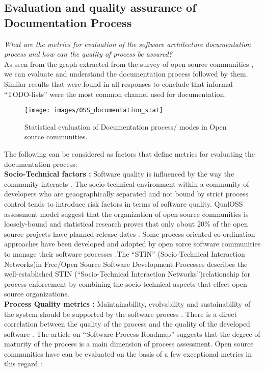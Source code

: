 \subsection{Evaluation and quality assurance of Documentation Process}
\indent \emph{What are the metrics for evaluation of the software architecture documentation process and how can the quality of process be assured?}
\\\indent As seen from the graph extracted from the survey of open source communities \cite{Zhao2003}, we can evaluate and understand the documentation process followed by them. Similar results that were found in all responses to conclude that informal \enquote{TODO-lists} were the most common channel used for documentation.
\begin{figure}[H]
  \centering
  \texttt{[image: images/OSS\_documentation\_stat]}
  \caption[Statistical evaluation of Documentation process/ modes in Open source communities]{Statistical evaluation of Documentation process/ modes in Open source communities.}\label{fig:MWDocProc}
\end{figure}
\indent The following can be considered as factors that define metrics for evaluating the documentation process:
\\\indent \textbf{Socio-Technical factors : } Software quality is influenced by the way the community interacts \cite{Mens2011}. The socio-technical environment within a community of developers who are geaographically separated and not bound by strict process control tends to introduce risk factors in terms of software quality. QualOSS assessment model \cite{5314237} suggest that the organization of open source communities is loosely-bound and statistical research \cite{Zhao2003} proves that only about 20\% of the open source projects have planned release dates . Some process oriented co-ordination approaches have been developed and adopted by open sorce software communities to manage their software processes .The \enquote{STIN} (Socio-Technical Interaction Networks)in Free/Open Source Software Development Processes \cite{SPM_2005} describes the well-established STIN (\enquote{Socio-Technical Interaction Networks})relationship for process enforcement by combining the socio-technical aspects that effect open source organizations. 
\\\indent \textbf{Process Quality metrics : } Maintainability, evolvability and sustainability of the system should be supported by the software process \cite{BachmannDocumentingSoftware2010} \cite{5314237}. There is a direct correlation between the quality of the process and the quality of the developed software \cite{Fuggeffa1988}. The article on \enquote{Software Process Roadmap} \cite{Fuggeffa1988} suggests that the degree of maturity of the process is a main dimension of process assessment. Open source communities have can be evaluated on the basis of a few exceptional metrics in this regard \cite{Zhao2003} :
